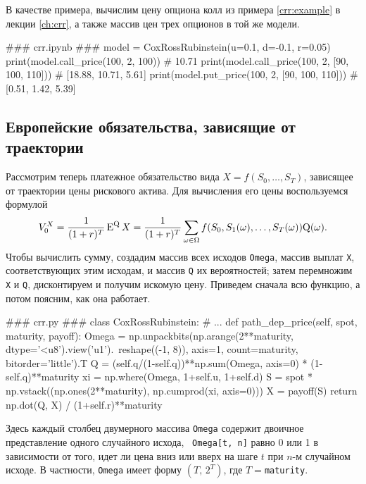 В качестве примера, вычислим цену опциона колл из примера \ref{crr:example} в лекции \ref{ch:crr}, а также массив цен трех опционов в той же модели.
\begin{python}
### crr.ipynb ###
model = CoxRossRubinstein(u=0.1, d=-0.1, r=0.05)
print(model.call_price(100, 2, 100))             # 10.71
print(model.call_price(100, 2, [90, 100, 110]))  # [18.88, 10.71, 5.61]
print(model.put_price(100, 2, [90, 100, 110]))   # [0.51, 1.42, 5.39]
\end{python}


\subsection{Европейские обязательства, зависящие от траектории}
\label{pr-crr:s:path-dep}
Рассмотрим теперь платежное обязательство вида $X = f(S_0,\dots,S_T)$, зависящее от траектории цены рискового актива. 
Для вычисления его цены воспользуемся формулой
\[
V_0^X = \frac1{(1+r)^T} \operatorname{E}^{\mathrm{Q}} X = \frac1{(1+r)^T} \sum_{\omega\in\Omega} f(S_0, S_1(\omega),\dots,S_T(\omega)) \mathrm{Q}(\omega).
\]
Чтобы вычислить сумму, создадим массив всех исходов \verb"Omega", массив выплат \verb"X", соответствующих этим исходам, и массив \verb"Q" их вероятностей; затем перемножим \verb"X" и \verb"Q", дисконтируем и получим искомую цену.
Приведем сначала всю функцию, а потом поясним, как она работает.
\begin{python}
### crr.py ###
class CoxRossRubinstein:
    # ...
    def path_dep_price(self, spot, maturity, payoff):
        Omega = np.unpackbits(np.arange(2**maturity, dtype='<u8').view('u1').\
            reshape((-1, 8)), axis=1, count=maturity, bitorder='little').T
        Q = (self.q/(1-self.q))**np.sum(Omega, axis=0) * (1-self.q)**maturity
        xi = np.where(Omega, 1+self.u, 1+self.d)
        S = spot * np.vstack((np.ones(2**maturity), np.cumprod(xi, axis=0)))
        X = payoff(S)
        return np.dot(Q, X) / (1+self.r)**maturity
\end{python}

Здесь каждый столбец двумерного массива \verb"Omega" содержит двоичное представление одного случайного исхода, \te\ \verb"Omega[t, n]" равно 0 или 1 в зависимости от того, идет ли цена вниз или вверх на шаге $t$ при $n$-м случайном исходе.
В частности, \verb"Omega" имеет форму $(T,\, 2^T)$, где $T=$\;\verb"maturity".

